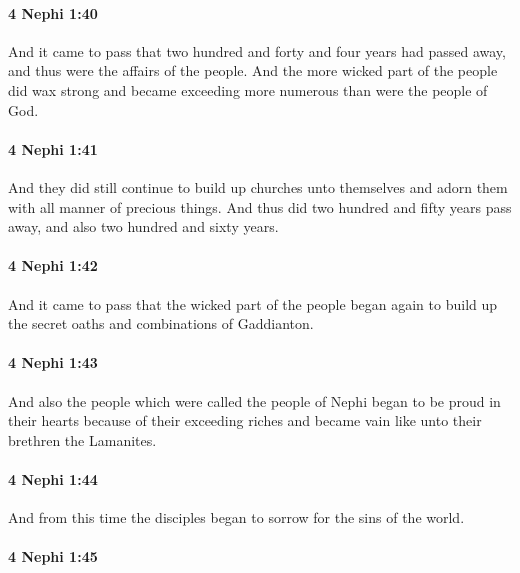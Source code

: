 		\paragraph{4 Nephi 1:40} %
			\label{4NEPHI-1-40}

			And it came to pass that
			two hundred and forty and four years had passed away,
			and thus were the affairs of the people.
			And the more wicked part of the people did wax strong
			and became exceeding more numerous than were the people of God.

		\paragraph{4 Nephi 1:41} %
			\label{4NEPHI-1-41}

			And they did still continue to build up churches unto themselves
			and adorn them with all manner of precious things.
			And thus did two hundred and fifty years pass away,
			and also two hundred and sixty years.

		\paragraph{4 Nephi 1:42} %
			\label{4NEPHI-1-42}

			And it came to pass that
			the wicked part of the people began again
			to build up the secret oaths and combinations of Gaddianton.

		\paragraph{4 Nephi 1:43} %
			\label{4NEPHI-1-43}

			And also the people which were called the people of Nephi began
			to be proud in their hearts because of their exceeding riches
			and became vain like unto their brethren the Lamanites.

		\paragraph{4 Nephi 1:44} %
			\label{4NEPHI-1-44}

			And from this time the disciples began to sorrow for the sins of the world.

		\paragraph{4 Nephi 1:45} %
			\label{4NEPHI-1-45}

